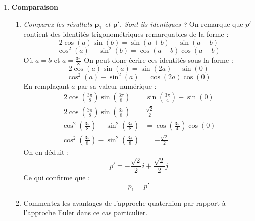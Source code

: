 \documentclass[a4paper,12pt]{article}
\begin{document}
\begin{enumerate}
    \item \textbf{Comparaison}
          \begin{enumerate}
              \item \emph{Comparez les résultats $\mathbf{p}_1$ et $\mathbf{p}'$. Sont-ils identiques ?} \newline \newline
              On remarque que $p'$ contient des identités trigonométriques remarquables de la forme :
               \begin{equation}
              2 \cos(a) \sin (b) = \sin(a + b) - \sin(a - b)
              \end{equation}
              \begin{equation}
              \cos^2(a) - \sin^2(b) = \cos(a + b) \cos(a - b)
              \end{equation}
              Où \(a = b \) et \(a = \frac{3 \pi}{8} \) \newline 
              On peut donc écrire ces identités sous la forme :
              \begin{equation}
              2 \cos(a) \sin (a) = \sin(2a) - \sin(0)
              \end{equation}
              \begin{equation}
              \cos^2(a) - \sin^2(a) = \cos(2a) \cos(0)
              \end{equation}
              En remplaçant $a$ par sa valeur numérique : 
              \begin{align}
              2 \cos(\frac{3 \pi}{8}) \sin (\frac{3 \pi}{8}) &= \sin(\frac{3 \pi}{4}) - \sin(0) \\
              2 \cos(\frac{3 \pi}{8}) \sin (\frac{3 \pi}{8}) &= \frac{\sqrt{2}}{2}
              \end{align}
              \begin{align}
              \cos^2(\frac{3 \pi}{8}) - \sin^2(\frac{3 \pi}{8}) &= \cos(\frac{3 \pi}{4}) \cos(0) \\
              \cos^2(\frac{3 \pi}{8}) - \sin^2(\frac{3 \pi}{8}) &= -\frac{\sqrt{2}}{2}
              \end{align}
              On en déduit :
              \begin{equation}
                \boxed{p' = -\frac{\sqrt{2}}{2} i + \frac{\sqrt{2}}{2} j}
              \end{equation}
              Ce qui confirme que :
              \begin{equation}
                \boxed{p_1 = p'}
              \end{equation}
              \item Commentez les avantages de l’approche quaternion par rapport à l’approche Euler dans ce cas particulier.
          \end{enumerate}
\end{enumerate}
\end{document}
